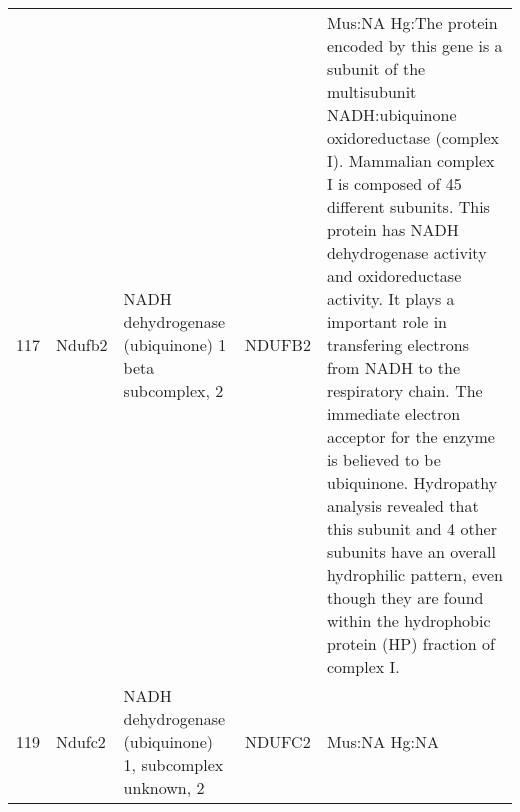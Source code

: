 \documentclass[11pt, landscape]{article}   	%
\begin{document}
\begin{table}[ht]
\begin{tabular}{rlp{3cm}lp{12cm}}
  117 & Ndufb2 & NADH dehydrogenase (ubiquinone) 1 beta subcomplex, 2 & NDUFB2 & Mus:NA Hg:The protein encoded by this gene is a subunit of the multisubunit NADH:ubiquinone oxidoreductase (complex I). Mammalian complex I is composed of 45 different subunits. This protein has NADH dehydrogenase activity and oxidoreductase activity. It plays a important role in transfering electrons from NADH to the respiratory chain. The immediate electron acceptor for the enzyme is believed to be ubiquinone. Hydropathy analysis revealed that this subunit and 4 other subunits have an overall hydrophilic pattern, even though they are found within the hydrophobic protein (HP) fraction of complex I. \\ 
  119 & Ndufc2 & NADH dehydrogenase (ubiquinone) 1, subcomplex unknown, 2 & NDUFC2 & Mus:NA Hg:NA \\ 

   \hline
\end{tabular}
\end{table}
\end{document}
